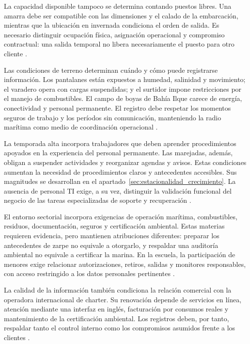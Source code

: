 La capacidad disponible tampoco se determina contando puestos libres. Una amarra debe ser compatible con las dimensiones y el calado de la embarcación, mientras que la ubicación en invernada condiciona el orden de salida. Es necesario distinguir ocupación física, asignación operacional y compromiso contractual: una salida temporal no libera necesariamente el puesto para otro cliente \parencite[cap.~3, p.~8; cap.~4, seccs.~4.1 y 4.6, pp.~9 y 11]{pucv-caso07-2026}.

Las condiciones de terreno determinan cuándo y cómo puede registrarse información. Los pantalanes están expuestos a humedad, salinidad y movimiento; el varadero opera con cargas suspendidas; y el surtidor impone restricciones por el manejo de combustibles. El campo de boyas de Bahía Ilque carece de energía, conectividad y personal permanente. El registro debe respetar los momentos seguros de trabajo y los períodos sin comunicación, manteniendo la radio marítima como medio de coordinación operacional \parencite[cap.~3, p.~8; cap.~6, pp.~14-15]{pucv-caso07-2026}.

La temporada alta incorpora trabajadores que deben aprender procedimientos apoyados en la experiencia del personal permanente. Las marejadas, además, obligan a suspender actividades y reorganizar agendas y avisos. Estas condiciones aumentan la necesidad de procedimientos claros y antecedentes accesibles. Sus magnitudes se desarrollan en el apartado~\ref{sec:estacionalidad_crecimiento}. La ausencia de personal TI exige, a su vez, distinguir la validación funcional del negocio de las tareas especializadas de soporte y recuperación \parencite[cap.~2, seccs.~2.2 y 2.4, pp.~6-8; cap.~4, secc.~4.5, pp.~10-11]{pucv-caso07-2026}.

El entorno sectorial incorpora exigencias de operación marítima, combustibles, residuos, documentación, seguros y certificación ambiental. Estas materias requieren evidencia, pero mantienen atribuciones diferentes: preparar los antecedentes de zarpe no equivale a otorgarlo, y respaldar una auditoría ambiental no equivale a certificar la marina. En la escuela, la participación de menores exige relacionar autorizaciones, retiros, salidas y monitores responsables, con acceso restringido a los datos personales pertinentes \parencite[cap.~2, secc.~2.1, p.~5; cap.~4, seccs.~4.3-4.9, pp.~10-12; cap.~10, p.~26; cap.~12, pp.~27-28; cap.~15, RT-16.09, p.~35]{pucv-caso07-2026}.

La calidad de la información también condiciona la relación comercial con la operadora internacional de charter. Su renovación depende de servicios en línea, atención mediante una interfaz en inglés, facturación por consumos reales y mantenimiento de la certificación ambiental. Los registros deben, por tanto, respaldar tanto el control interno como los compromisos asumidos frente a los clientes \parencite[cap.~1, pp.~4-5]{pucv-caso07-2026}.

